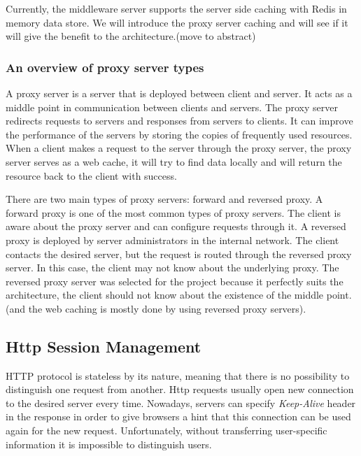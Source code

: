 Currently, the middleware server supports the server side caching with Redis in memory data store. We will introduce the proxy server caching and will see if it will give the benefit to the architecture.(move to abstract) 

\subsubsection{An overview of proxy server types}

A proxy server is a server that is deployed between client and server. It acts as a middle point in communication between clients and servers. The proxy server redirects requests to servers and responses from servers to clients. It can improve the performance of the servers by storing the copies of frequently used resources. When a client makes a request to the server through the proxy server, the  proxy server serves as a web cache, it will try to find data locally and will return the resource back to the client with success.

There are two main types of proxy servers: forward and reversed proxy\cite{WWWCaching}.
A forward proxy is one of the most common types of proxy servers. The client is aware about the proxy server and can configure requests through it.
A reversed proxy is deployed by server administrators in the internal network. The client contacts the desired server, but the request is routed through the reversed proxy server. In this case, the client may not know about the underlying proxy. 
The reversed proxy server was selected for the project because it perfectly suits the architecture, the client should not know about the existence of the middle point. (and the web caching is mostly done by using reversed proxy servers).


\subsection{Http Session Management}

HTTP protocol is stateless by its nature, meaning that there is no possibility to distinguish one request from another. Http requests usually open new connection to the desired server every time. Nowadays, servers can specify \textit{Keep-Alive} header in the response in order to give browsers a hint that this connection can be used again for the new request. Unfortunately, without transferring user-specific information it is impossible to distinguish users.  

